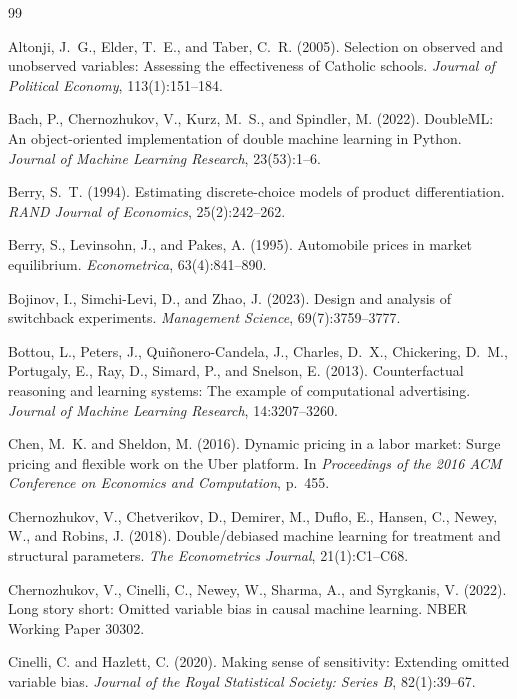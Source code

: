 \documentclass[11pt]{article}
\theoremstyle{remark}
\begin{document}
\begin{thebibliography}{99}

Altonji, J.~G., Elder, T.~E., and Taber, C.~R. (2005).
Selection on observed and unobserved variables: Assessing the effectiveness of Catholic schools.
\emph{Journal of Political Economy}, 113(1):151--184.

Bach, P., Chernozhukov, V., Kurz, M.~S., and Spindler, M. (2022).
DoubleML: An object-oriented implementation of double machine learning in Python.
\emph{Journal of Machine Learning Research}, 23(53):1--6.

Berry, S.~T. (1994).
Estimating discrete-choice models of product differentiation.
\emph{RAND Journal of Economics}, 25(2):242--262.

Berry, S., Levinsohn, J., and Pakes, A. (1995).
Automobile prices in market equilibrium.
\emph{Econometrica}, 63(4):841--890.

Bojinov, I., Simchi-Levi, D., and Zhao, J. (2023).
Design and analysis of switchback experiments.
\emph{Management Science}, 69(7):3759--3777.

Bottou, L., Peters, J., Qui\~nonero-Candela, J., Charles, D.~X., Chickering, D.~M., Portugaly, E., Ray, D., Simard, P., and Snelson, E. (2013).
Counterfactual reasoning and learning systems: The example of computational advertising.
\emph{Journal of Machine Learning Research}, 14:3207--3260.

Chen, M.~K. and Sheldon, M. (2016).
Dynamic pricing in a labor market: Surge pricing and flexible work on the Uber platform.
In \emph{Proceedings of the 2016 ACM Conference on Economics and Computation}, p.~455.

Chernozhukov, V., Chetverikov, D., Demirer, M., Duflo, E., Hansen, C., Newey, W., and Robins, J. (2018).
Double/debiased machine learning for treatment and structural parameters.
\emph{The Econometrics Journal}, 21(1):C1--C68.

Chernozhukov, V., Cinelli, C., Newey, W., Sharma, A., and Syrgkanis, V. (2022).
Long story short: Omitted variable bias in causal machine learning.
NBER Working Paper 30302.

Cinelli, C. and Hazlett, C. (2020).
Making sense of sensitivity: Extending omitted variable bias.
\emph{Journal of the Royal Statistical Society: Series B}, 82(1):39--67.


\end{thebibliography}
\end{document}
